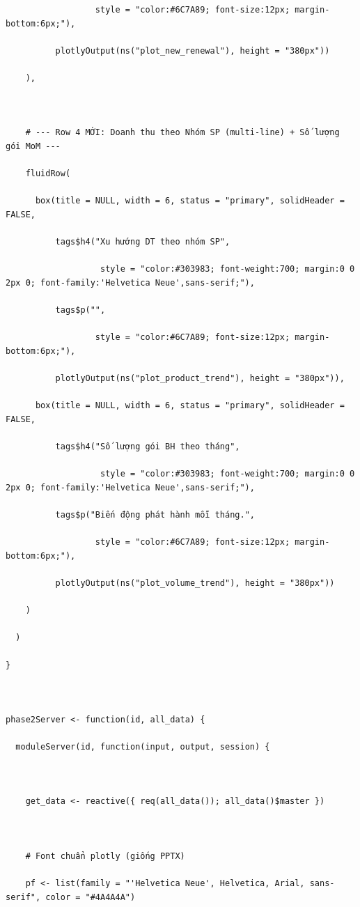 \documentclass[12pt, a4paper]{article}
\begin{document}
\begin{lstlisting}
                  style = "color:#6C7A89; font-size:12px; margin-bottom:6px;"),

          plotlyOutput(ns("plot_new_renewal"), height = "380px"))

    ),



    # --- Row 4 MỚI: Doanh thu theo Nhóm SP (multi-line) + Số lượng gói MoM ---

    fluidRow(

      box(title = NULL, width = 6, status = "primary", solidHeader = FALSE,

          tags$h4("Xu hướng DT theo nhóm SP",

                   style = "color:#303983; font-weight:700; margin:0 0 2px 0; font-family:'Helvetica Neue',sans-serif;"),

          tags$p("",

                  style = "color:#6C7A89; font-size:12px; margin-bottom:6px;"),

          plotlyOutput(ns("plot_product_trend"), height = "380px")),

      box(title = NULL, width = 6, status = "primary", solidHeader = FALSE,

          tags$h4("Số lượng gói BH theo tháng",

                   style = "color:#303983; font-weight:700; margin:0 0 2px 0; font-family:'Helvetica Neue',sans-serif;"),

          tags$p("Biến động phát hành mỗi tháng.",

                  style = "color:#6C7A89; font-size:12px; margin-bottom:6px;"),

          plotlyOutput(ns("plot_volume_trend"), height = "380px"))

    )

  )

}



phase2Server <- function(id, all_data) {

  moduleServer(id, function(input, output, session) {



    get_data <- reactive({ req(all_data()); all_data()$master })



    # Font chuẩn plotly (giống PPTX)

    pf <- list(family = "'Helvetica Neue', Helvetica, Arial, sans-serif", color = "#4A4A4A")




\end{lstlisting}
\end{document}
